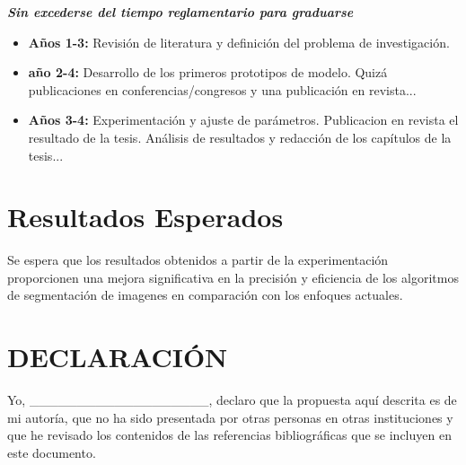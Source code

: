 \documentclass[a4paper,12pt]{article}
\begin{document}
\textbf{\emph{Sin excederse del tiempo reglamentario para graduarse}}


\begin{itemize}
	\item \textbf{Años 1-3:} Revisión de literatura y definición del problema de investigación.
	\item \textbf{año 2-4:} Desarrollo de los primeros prototipos de modelo. Quizá publicaciones en conferencias/congresos y una publicación en revista...
	\item \textbf{Años 3-4:} Experimentación y ajuste de parámetros. Publicacion en revista el resultado de la tesis.
	      Análisis de resultados y redacción de los capítulos de la tesis...
\end{itemize}

\newpage

\section{Resultados Esperados}
Se espera que los resultados obtenidos a partir de la experimentación proporcionen una mejora significativa en la precisión y eficiencia de los algoritmos de segmentación de imagenes en comparación con los enfoques actuales.\cite{referencia2}

\newpage

\section*{}

%			
%			

\newpage

\section*{DECLARACIÓN}

Yo, \_\_\_\_\_\_\_\_\_\_\_\_\_\_\_\_\_\_\_, declaro que la propuesta aquí descrita es de mi autoría, que no ha sido presentada por otras personas en otras instituciones y que he revisado los contenidos de las referencias bibliográficas que se incluyen en este documento.
\end{document}
